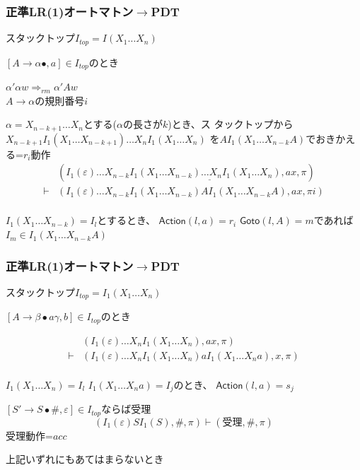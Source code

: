 \documentclass[ckj]{beamer}
\begin{document}
\begin{frame}
 \frametitle{正準LR(1)オートマトン$\rightarrow$PDT}
 スタックトップ$I_{top}=I(X_1\ldots X_n)$
 \begin{trivlist}
  \item [{\bf 還元(Reduce)}]
	$[A\rightarrow\alpha\bullet,a]\in I_{top}$のとき

	$\alpha'\alpha w\Rightarrow_{rm}\alpha'Aw$\\
	$A\rightarrow\alpha$の規則番号$i$

	$\alpha=X_{n-k+1}\ldots X_n$とする($\alpha$の長さが$k$)とき、ス
	タックトップから\\
	$X_{n-k+1}I_1(X_1\ldots X_{n-k+1})\ldots X_n I_1(X_1\ldots X_n)$
	を$AI_1(X_1\ldots X_{n-k}A)$でおきかえる=$r_i$動作
	\[
	 \begin{array}{ll}
	  & (I_1(\varepsilon)\ldots X_{n-k}I_1\underline{(X_1\ldots
	   X_{n-k})\ldots  X_nI_1(X_1\ldots X_n)},ax,\pi)\\
	  \vdash 
	  & (I_1(\varepsilon)\ldots X_{n-k}I_1(X_1\ldots X_{n-k})A
	   I_1(X_1\ldots X_{n-k}A),ax,\pi i)\\
	 \end{array}
	\]


	$I_1(X_1\ldots X_{n-k})=I_l$とするとき、
	$\mathsf{Action}(l,a)=r_i$
	$\mathsf{Goto}(l,A)=m$であれば$I_m\in I_1(X_1\ldots X_{n-k}A)$
 \end{trivlist}
\end{frame}

\begin{frame}
 \frametitle{正準LR(1)オートマトン$\rightarrow$PDT}
 スタックトップ$I_{top}=I_1(X_1\ldots X_n)$
 \begin{trivlist}
  \item [{\bf シフト(Shift)}]
	$[A\rightarrow\beta\bullet a\gamma,b]\in I_{top}$のとき

	\[
	 \begin{array}{ll}
	  & (I_1(\varepsilon)\ldots X_nI_1(X_1\ldots X_n),ax,\pi)\\
	  \vdash 
	  & (I_1(\varepsilon)\ldots X_nI_1(X_1\ldots X_n)aI_1(X_1\ldots X_na),x,\pi)\\
	 \end{array}
	\]

	$I_1(X_1\ldots X_n)=I_l$ $I_1(X_1\ldots X_na)=I_j$のとき、
	$\mathsf{Action}(l,a)=s_j$
  \item [{\bf 受理(Accept)}]
	$[S'\rightarrow S\bullet\#,\varepsilon]\in I_{top}$ならば受理
	\[
	 (I_1(\varepsilon)SI_1(S),\#,\pi)\vdash(\mbox{受理},\#,\pi)
	\]
	受理動作=$acc$
  \item [{\bf 誤り(Error)}]
	上記いずれにもあてはまらないとき
 \end{trivlist}
\end{frame}
\end{document}
